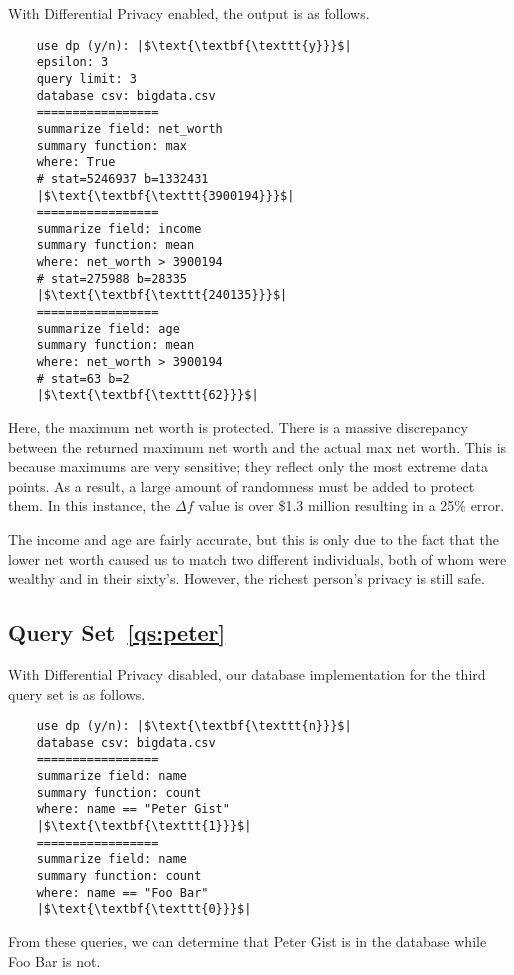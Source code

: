 \documentclass[conference,11pt]{IEEEtran}
\begin{document}
With Differential Privacy enabled, the output is as follows.
\begin{verbatim}
    use dp (y/n): |$\text{\textbf{\texttt{y}}}$|
    epsilon: 3
    query limit: 3
    database csv: bigdata.csv
    =================
    summarize field: net_worth
    summary function: max
    where: True
    # stat=5246937 b=1332431
    |$\text{\textbf{\texttt{3900194}}}$|
    =================
    summarize field: income
    summary function: mean
    where: net_worth > 3900194
    # stat=275988 b=28335
    |$\text{\textbf{\texttt{240135}}}$|
    =================
    summarize field: age
    summary function: mean
    where: net_worth > 3900194
    # stat=63 b=2
    |$\text{\textbf{\texttt{62}}}$|
\end{verbatim}
Here, the maximum net worth is protected. There is a massive discrepancy between
the returned maximum net worth and the actual max net worth. This is because
maximums are very sensitive; they reflect only the most extreme data points. As
a result, a large amount of randomness must be added to protect them.  In this
instance, the $\Delta f$ value is over \$1.3 million resulting in a 25\% error.

The income and age are fairly accurate, but this is only due to the fact that
the lower net worth caused us to match two different individuals, both of whom
were wealthy and in their sixty's. However, the richest person's privacy is
still safe.

\subsection{Query Set~\ref{qs:peter}}
With Differential Privacy disabled, our database implementation for the third
query set is as follows.
\begin{verbatim}
    use dp (y/n): |$\text{\textbf{\texttt{n}}}$|
    database csv: bigdata.csv
    =================
    summarize field: name
    summary function: count
    where: name == "Peter Gist"
    |$\text{\textbf{\texttt{1}}}$|
    =================
    summarize field: name
    summary function: count
    where: name == "Foo Bar"
    |$\text{\textbf{\texttt{0}}}$|
\end{verbatim}
From these queries, we can determine that Peter Gist is in the database while
Foo Bar is not.
\end{document}
